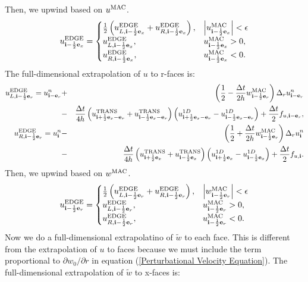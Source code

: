 \documentclass[11pt]{article}
\def\half  {\frac{1}{2}}
\def\dt    {\Delta t}
\def\edge  {\rm EDGE}
\def\mac   {\rm MAC}
\def\trans {\rm TRANS}
\def\eb    {{\bf e}}
\def\ib    {{\bf i}}
\def\wt    {\tilde{w}}
\begin{document}
Then, we upwind based on $u^{\mac}$.
\begin{equation}
u_{\ib-\half\eb_x}^{\edge} =
\begin{cases}
\half\left(u_{L,\ib-\half\eb_x}^{\edge} + u_{R,\ib-\half\eb_x}^{\edge}\right), & \left|u^{\mac}_{\ib-\half\eb_x}\right| < \epsilon \\
u_{L,\ib-\half\eb_x}^{\edge}, & u^{\mac}_{\ib-\half\eb_x} > 0, \\
u_{R,\ib-\half\eb_x}^{\edge}, & u^{\mac}_{\ib-\half\eb_x} < 0.
\end{cases}
\end{equation}
The full-dimensional extrapolation of $u$ to r-faces is:
\begin{eqnarray}
u_{L,\ib-\half\eb_r}^{\edge} = u_{\ib-\eb_r}^n &+& \left(\half - \frac{\dt}{2h}w_{\ib-\half\eb_r}^{\mac}\right)\Delta_r u_{\ib-\eb_r}^n \nonumber \\
&-& \frac{\dt}{4h}\left(u_{\ib+\half\eb_x-\eb_r}^{\trans}+u_{\ib-\half\eb_x-\eb_r}^{\trans}\right)\left(u_{\ib+\half\eb_x-\eb_r}^{1D} - u_{\ib-\half\eb_x-\eb_r}^{1D}\right) + \frac{\dt}{2}f_{u,\ib-\eb_r},  \\
u_{R,\ib-\half\eb_r}^{\edge} = u_{\ib}^n &-& \left(\half + \frac{\dt}{2h}w_{\ib-\half\eb_r}^{\mac}\right)\Delta_r u_{\ib}^n \nonumber \\
&-& \frac{\dt}{4h}\left(u_{\ib+\half\eb_x}^{\trans}+u_{\ib-\half\eb_x}^{\trans}\right)\left(u_{\ib+\half\eb_x}^{1D} - u_{\ib-\half\eb_x}^{1D}\right) + \frac{\dt}{2}f_{u,\ib}. 
\end{eqnarray}
Then, we upwind based on $w^{\mac}$.
\begin{equation}
u_{\ib-\half\eb_r}^{\edge} =
\begin{cases}
\half\left(u_{L,\ib-\half\eb_r}^{\edge} + u_{R,\ib-\half\eb_r}^{\edge}\right), & \left|w^{\mac}_{\ib-\half\eb_r}\right| < \epsilon \\
u_{L,\ib-\half\eb_r}^{\edge}, & u^{\mac}_{\ib-\half\eb_r} > 0, \\
u_{R,\ib-\half\eb_r}^{\edge}, & u^{\mac}_{\ib-\half\eb_r} < 0.
\end{cases}
\end{equation}
Now we do a full-dimensional extrapolatino of $\wt$ to each face.  This is different from the extrapolation of $u$ to faces because we must include the term proportional to $\partial w_0/\partial r$ in equation (\ref{Perturbational Velocity Equation}).  The full-dimensional extrapolation of $\wt$ to x-faces is:
\end{document}
